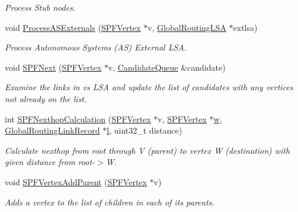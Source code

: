 \begin{DoxyCompactItemize}
\begin{DoxyCompactList}\small\item\em Process Stub nodes. \end{DoxyCompactList}\item 
void \hyperlink{classns3_1_1GlobalRouteManagerImpl_a1b3aa701b33156b04d351f33e3ebdcb4}{Process\+A\+S\+Externals} (\hyperlink{classns3_1_1SPFVertex}{S\+P\+F\+Vertex} $\ast$v, \hyperlink{classns3_1_1GlobalRoutingLSA}{Global\+Routing\+L\+SA} $\ast$extlsa)
\begin{DoxyCompactList}\small\item\em Process Autonomous Systems (AS) External L\+SA. \end{DoxyCompactList}\item 
void \hyperlink{classns3_1_1GlobalRouteManagerImpl_aaa3d86729d6cfb61708d1c7083423da6}{S\+P\+F\+Next} (\hyperlink{classns3_1_1SPFVertex}{S\+P\+F\+Vertex} $\ast$v, \hyperlink{classns3_1_1CandidateQueue}{Candidate\+Queue} \&candidate)
\begin{DoxyCompactList}\small\item\em Examine the links in v\textquotesingle{}s L\+SA and update the list of candidates with any vertices not already on the list. \end{DoxyCompactList}\item 
int \hyperlink{classns3_1_1GlobalRouteManagerImpl_ab082a78c423009f77c9cfe9018d40021}{S\+P\+F\+Nexthop\+Calculation} (\hyperlink{classns3_1_1SPFVertex}{S\+P\+F\+Vertex} $\ast$v, \hyperlink{classns3_1_1SPFVertex}{S\+P\+F\+Vertex} $\ast$\hyperlink{mmwave_2model_2fading-traces_2fading__trace__generator_8m_afd61ec66f9d7b807eece6eb12c781844}{w}, \hyperlink{classns3_1_1GlobalRoutingLinkRecord}{Global\+Routing\+Link\+Record} $\ast$\hyperlink{lte__pathloss_8m_a5b54c0a045f179bcbbbc9abcb8b5cd4c}{l}, uint32\+\_\+t distance)
\begin{DoxyCompactList}\small\item\em Calculate nexthop from root through V (parent) to vertex W (destination) with given distance from root-\/$>$W. \end{DoxyCompactList}\item 
void \hyperlink{classns3_1_1GlobalRouteManagerImpl_ae7824a06e22187d1dc6823c46c95a3fc}{S\+P\+F\+Vertex\+Add\+Parent} (\hyperlink{classns3_1_1SPFVertex}{S\+P\+F\+Vertex} $\ast$v)
\begin{DoxyCompactList}\small\item\em Adds a vertex to the list of children {\itshape in} each of its parents. \end{DoxyCompactList}\item 

\end{DoxyCompactItemize}
